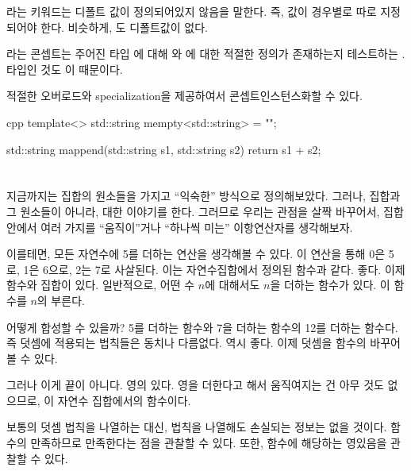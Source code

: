 라는 키워드는 디폴트 값이 정의되어있지 않음을 말한다. 
즉, 값이 경우별로 따로 지정되어야 한다.
비슷하게, 도 디폴트값이 없다.

라는 콘셉트는
주어진 타입 에 대해 와 에 대한 적절한 정의가 존재하는지 테스트하는 .
 타입인 것도 이 때문이다.

적절한 오버로드와 specialization을 제공하여서 \trMonoid 콘셉트\를 인스턴스화할 수 있다.

\begin{snip}{cpp}
template<>
std::string mempty<std::string> = {""};

std::string mappend(std::string s1, std::string s2) { 
    return s1 + s2;
}
\end{snip}

\section{\trCategory{} \trMonoid }

지금까지는 집합의 원소들을 가지고 ``익숙한'' 방식으로 \trMonoid\를 정의해보았다. 
그러나,  집합과 그 원소들이 아니라, \trObject\와  대한 이야기를 한다.
그러므로 우리는 관점을 살짝 바꾸어서, 집합 안에서 여러 가지를 ``움직이''거나 ``하나씩 미는'' 이항연산자를 생각해보자.

이를테면, 모든 자연수에 5를 더하는 연산을 생각해볼 수 있다. 이 연산을 통해 0은 5로, 1은 6으로, 2는 7로 사살된다.
이는 자연수집합에서 정의된 함수과 같다. 좋다. 이제 함수와 집합이 있다. 
일반적으로, 어떤 수 $n$에 대해서도 $n$을 더하는 함수가 있다. 이 함수를 $n$의 \trAdder{} 부른다.

\trAdder\는 어떻게 합성할 수 있을까? 5를 더하는 함수와 7을 더하는 함수의 \trComposition\은 12를 더하는 함수다.
즉  \trComposition\과 덧셈에 적용되는 법칙들은 동치나 다름없다. 역시 좋다. 이제 덧셈을 함수의 \trComposition\로 바꾸어 볼 수 있다.

그러나 이게 끝이 아니다.  영의  있다. 영을 더한다고 해서 움직여지는 건 아무 것도 없으므로,
이 \trAdder\은 자연수 집합에서의 \trIdentity 함수이다.

보통의 덧셈 법칙을 나열하는 대신,  법칙을 나열해도 손실되는 정보는 없을 것이다.
함수의 \trComposition\이 \trAssociativity\를 만족하므로   \trAssociativity\을 만족한다는 점을 관찰할 수 있다.
또한, \trIdentity 함수에 해당하는 영 있음을 관찰할 수 있다.

